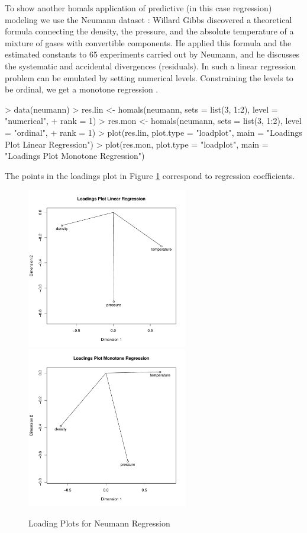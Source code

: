 \documentclass[article]{Z}
\begin{document}
To show another homals application of predictive (in this case regression) modeling we use the Neumann dataset \citep{Wilson:26}: Willard Gibbs discovered a theoretical formula connecting the density, the
pressure, and the absolute temperature of a mixture of gases with convertible 
components. He applied this formula and the estimated constants to 65 experiments
carried out by Neumann, and he discusses the systematic and accidental divergences (residuals). In  such a linear regression problem can be emulated by setting numerical levels. Constraining the levels to be ordinal, we get a monotone regression \citep{Gifi:90}. 

\begin{Schunk}
\begin{Sinput}
> data(neumann)
> res.lin <- homals(neumann, sets = list(3, 1:2), level = "numerical", 
+     rank = 1)
> res.mon <- homals(neumann, sets = list(3, 1:2), level = "ordinal", 
+     rank = 1)
> plot(res.lin, plot.type = "loadplot", main = "Loadings Plot Linear Regression")
> plot(res.mon, plot.type = "loadplot", main = "Loadings Plot Monotone Regression")
\end{Sinput}
\end{Schunk}

The points in the loadings plot in Figure \ref{fig:neuload} correspond to regression coefficients.

\begin{figure}[hbt]
\begin{center}
\includegraphics[height=70mm, width=70mm]{neuloadlin.pdf}
\includegraphics[height=70mm, width=70mm]{neuloadmon.pdf}
\caption{\label{fig:neuload}Loading Plots for Neumann Regression}
\end{center}
\end{figure}
\end{document}
